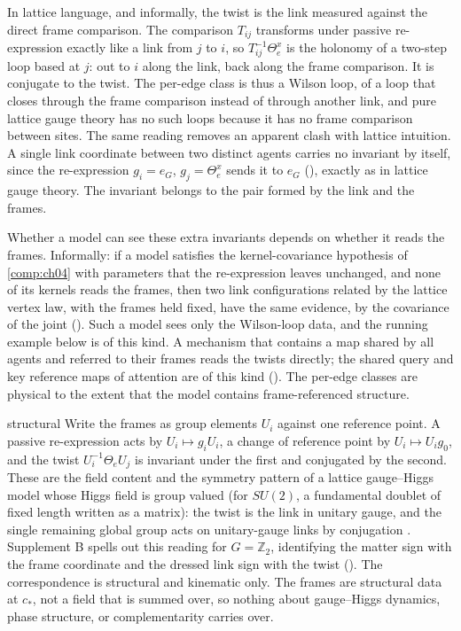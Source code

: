In lattice language, and informally, the twist is the link measured against the direct frame comparison.
The comparison $T_{ij}$ transforms under passive re-expression exactly like a link from $j$ to $i$, so
$T_{ij}^{-1}\Theta_e^x$ is the holonomy of a two-step loop based at $j$: out to $i$ along the link, back
along the frame comparison. It is conjugate to the twist. The per-edge class is thus a Wilson loop, of a
loop that closes through the frame comparison instead of through another link, and pure lattice gauge
theory has no such loops because it has no frame comparison between sites. The same reading removes an
apparent clash with lattice intuition. A single link coordinate between two distinct agents carries no
invariant by itself, since the re-expression $g_i=e_G$, $g_j=\Theta_e^x$ sends it to $e_G$
(), exactly as in lattice gauge theory. The invariant belongs to the pair
formed by the link and the frames.

Whether a model can see these extra invariants depends on whether it reads the frames. Informally: if a model
satisfies the kernel-covariance hypothesis of \cref{comp:ch04} with parameters that the re-expression leaves
unchanged, and none of its kernels reads the frames, then two link configurations related by the lattice
vertex law, with the frames held fixed, have the same evidence, by the covariance of the joint
(). Such a model sees only the Wilson-loop data, and the running
example below is of this kind. A mechanism that contains a map shared by all agents and referred to their
frames reads the twists directly; the shared query and key reference maps of attention are of this kind
(). The per-edge classes are physical to the extent that the model
contains frame-referenced structure.

\begin{analogy}{structural}
Write the frames as group elements $U_i$ against one reference point. A passive re-expression acts by
$U_i\mapsto g_iU_i$, a change of reference point by $U_i\mapsto U_ig_0$, and the twist $U_i^{-1}\Theta_eU_j$
is invariant under the first and conjugated by the second. These are the field content and the symmetry
pattern of a lattice gauge--Higgs model whose Higgs field is group valued (for $SU(2)$, a fundamental doublet
of fixed length written as a matrix): the twist is the link in unitary gauge, and the single remaining global
group acts on unitary-gauge links by conjugation \citep{FradkinShenker1979,OsterwalderSeiler1978}.
Supplement B spells out this reading for $G=\mathbb Z_2$, identifying the matter sign with the frame
coordinate and the dressed link sign with the twist (). The correspondence is
structural and kinematic only. The frames are structural data at $c_*$, not a field that is summed over, so
nothing about gauge--Higgs dynamics, phase structure, or complementarity carries over.
\end{analogy}

